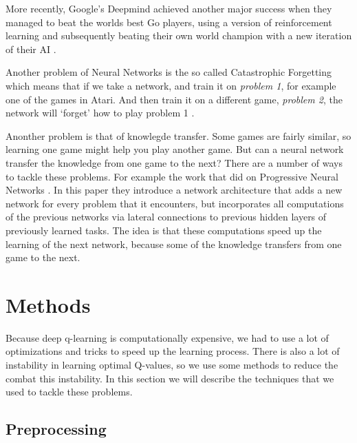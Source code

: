\documentclass{article}
\begin{document}
More recently, Google's Deepmind achieved another major success when they managed to beat the worlds best Go players, using a version of reinforcement learning and subsequently beating their own world champion with a new iteration of their AI \cite{silver2017mastering}.

Another problem of Neural Networks is the so called Catastrophic Forgetting which means that if we take a network, and train it on \textit{problem 1}, for example one of the games in Atari. And then train it on a different game, \textit{problem 2}, the network will `forget' how to play problem 1 \cite{rusu2016progressive}.

Anonther problem is that of knowlegde transfer. Some games are fairly similar, so learning one game might help you play another game. But can a neural network transfer the knowledge from one game to the next? There are a number of ways to tackle these problems. For example the work that \citeauthor{rusu2016progressive} did on Progressive Neural Networks \cite{rusu2016progressive}. In this paper they introduce a network architecture that adds a new network for every problem that it encounters, but incorporates all computations of the previous networks via lateral connections to previous hidden layers of previously learned tasks. The idea is that these computations speed up the learning of the next network, because some of the knowledge transfers from one game to the next.


\section{Methods}
Because deep q-learning is computationally expensive, we had to use a lot of optimizations and tricks to speed up the learning process. There is also a lot of instability in learning optimal Q-values, so we use some methods to reduce the combat this instability. In this section we will describe the techniques that we used to tackle these problems.

\subsection{Preprocessing}
\end{document}
